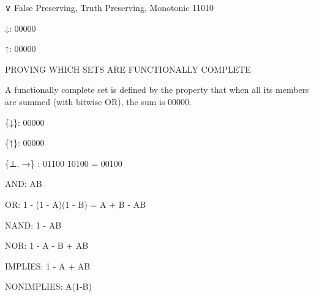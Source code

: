∨ False Preserving, Truth Preserving, Monotonic 11010

↓: 00000

↑: 00000

PROVING WHICH SETS ARE FUNCTIONALLY COMPLETE

A functionally complete set is defined by the property that when all its
members are summed (with bitwise OR), the sum is 00000.

\{↓\}: 00000

\{↑\}: 00000

\{⊥, →\} : 01100 \textbar\textbar{} 10100 = 00100

AND: AB

OR: 1 - (1 - A)(1 - B) = A + B - AB

NAND: 1 - AB

NOR: 1 - A - B + AB

IMPLIES: 1 - A + AB

NONIMPLIES: A(1-B)